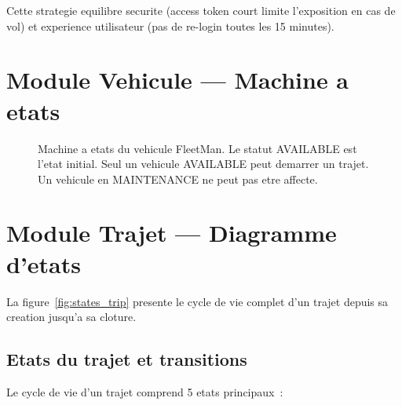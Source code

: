 \documentclass[12pt,a4paper]{report}
\begin{document}
Cette strategie equilibre securite (access token court limite l'exposition
en cas de vol) et experience utilisateur (pas de re-login toutes les
15 minutes).

\section{Module Vehicule --- Machine a etats}

\begin{figure}[H]
  \centering
  \caption{Machine a etats du vehicule FleetMan.
           Le statut AVAILABLE est l'etat initial.
           Seul un vehicule AVAILABLE peut demarrer un trajet.
           Un vehicule en MAINTENANCE ne peut pas etre affecte.}
  \label{fig:vehicle_states}
\end{figure}

\section{Module Trajet --- Diagramme d'etats}

La figure~\ref{fig:states_trip} presente le cycle de vie complet
d'un trajet depuis sa creation jusqu'a sa cloture.

\subsection{Etats du trajet et transitions}

Le cycle de vie d'un trajet comprend 5 etats principaux~:
\end{document}
